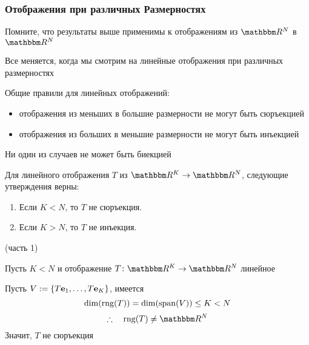 \begin{frame}

    \frametitle{Отображения при различных Размерностях} 

    \vspace{2em}
    Помните, что результаты выше применимы к отображениям из $\RR^N$ в $\RR^N$

    Все меняется, когда мы смотрим на линейные отображения при различных размерностях

    \vspace{.7em}

    Общие правили для линейных отображений: 

    \begin{itemize}
        \item отображения из меньших в большие размерности не могут быть сюръекцией
        \item отображения из больших в меньшие размерности не могут быть инъекцией
    \end{itemize}

    Ни один из случаев не может быть биекцией

    \vspace{1em}

\end{frame}

\begin{frame}
    
    \vspace{2em}
    \Thm{\eqref{ET-t:lfoc}}
    Для линейного отображения $T$ из $\RR^K \to \RR^N$, следующие утверждения верны:
    \begin{enumerate}
        \item Если $K < N$, то $T$ не сюръекция.
        \item Если $K > N$, то $T$ не инъекция.
    \end{enumerate}
    \Prf(часть 1)
    
    Пусть $K < N$ и отображение $T \colon \RR^K \to \RR^N$ линейное  
    
    Пусть $V := \{T{\mathbf e}_1, \ldots, T{\mathbf e}_K\}$, имеется
    $$
    \dim(\operatorname{rng}(T)) = \dim(\operatorname{span}(V)) \leq K < N
    $$
    $$
    \fore 
        \range(T) \not= \RR^N
    $$
    Значит, $T$ не сюръекция 
    
\end{frame}

